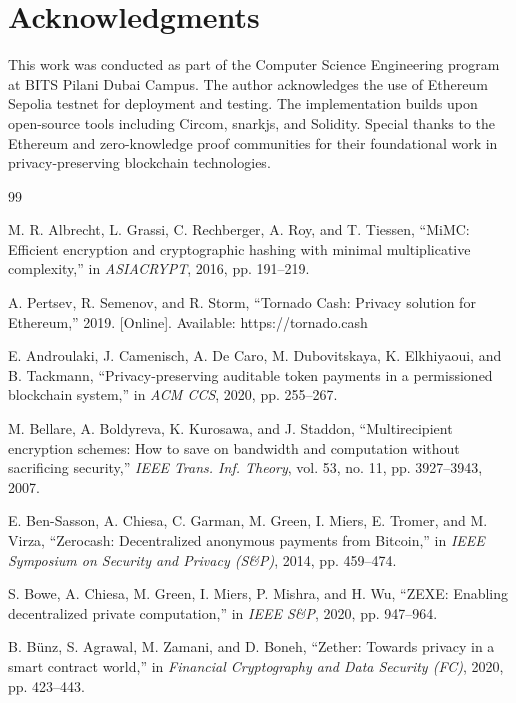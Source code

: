 \documentclass[conference]{IEEEtran}
\begin{document}
% 
% 
\section*{Acknowledgments}

This work was conducted as part of the Computer Science Engineering program at BITS Pilani Dubai Campus. The author acknowledges the use of Ethereum Sepolia testnet for deployment and testing. The implementation builds upon open-source tools including Circom, snarkjs, and Solidity. Special thanks to the Ethereum and zero-knowledge proof communities for their foundational work in privacy-preserving blockchain technologies.

% 
% 

\begin{thebibliography}{99}

M. R. Albrecht, L. Grassi, C. Rechberger, A. Roy, and T. Tiessen, ``MiMC: Efficient encryption and cryptographic hashing with minimal multiplicative complexity,'' in \textit{ASIACRYPT}, 2016, pp. 191--219.

A. Pertsev, R. Semenov, and R. Storm, ``Tornado Cash: Privacy solution for Ethereum,'' 2019. [Online]. Available: https://tornado.cash

E. Androulaki, J. Camenisch, A. De Caro, M. Dubovitskaya, K. Elkhiyaoui, and B. Tackmann, ``Privacy-preserving auditable token payments in a permissioned blockchain system,'' in \textit{ACM CCS}, 2020, pp. 255--267.

M. Bellare, A. Boldyreva, K. Kurosawa, and J. Staddon, ``Multirecipient encryption schemes: How to save on bandwidth and computation without sacrificing security,'' \textit{IEEE Trans. Inf. Theory}, vol. 53, no. 11, pp. 3927--3943, 2007.

E. Ben-Sasson, A. Chiesa, C. Garman, M. Green, I. Miers, E. Tromer, and M. Virza, ``Zerocash: Decentralized anonymous payments from Bitcoin,'' in \textit{IEEE Symposium on Security and Privacy (S&P)}, 2014, pp. 459--474.

S. Bowe, A. Chiesa, M. Green, I. Miers, P. Mishra, and H. Wu, ``ZEXE: Enabling decentralized private computation,'' in \textit{IEEE S&P}, 2020, pp. 947--964.

B. Bünz, S. Agrawal, M. Zamani, and D. Boneh, ``Zether: Towards privacy in a smart contract world,'' in \textit{Financial Cryptography and Data Security (FC)}, 2020, pp. 423--443.


\end{thebibliography}
\end{document}
